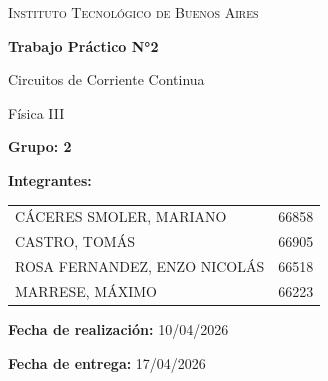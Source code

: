 \documentclass[11pt]{article}
\begin{document}
\begin{titlepage}
    \centering

    \vspace{1cm}

    {\scshape\LARGE Instituto Tecnológico de Buenos Aires \par}
    \vspace{0.6cm}

    {\huge\bfseries Trabajo Práctico N°2 \par}
    \vspace{0.4cm}
    {\Large Circuitos de Corriente Continua \par}
    \vspace{0.2cm}
    {\large Física III \par}

    \vspace{1.2cm}

    \begin{flushleft}
    {\Large\textbf{Grupo: 2}\par}
    \vspace{0.5cm}

    {\Large\textbf{Integrantes:}\par}
    \vspace{0.3cm}
    \begin{tabular}{l r}
        CÁCERES SMOLER, MARIANO      & 66858 \\
        CASTRO, TOMÁS                & 66905 \\
        ROSA FERNANDEZ, ENZO NICOLÁS & 66518 \\
        MARRESE, MÁXIMO              & 66223 \\
    \end{tabular}
    \end{flushleft}

    \vfill

    \begin{flushleft}
    {\large \textbf{Fecha de realización:} 10/04/2026\par}
    {\large \textbf{Fecha de entrega:} 17/04/2026\par}
    \end{flushleft}

    \vspace{0.6cm}


\end{titlepage}
\end{document}
